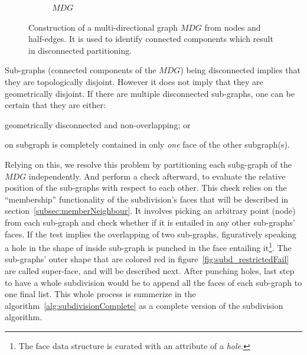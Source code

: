\begin{figure}
\begin{subfigure}{.32\textwidth}
    \caption{$\mathit{MDG}$} \label{subfig:subd_mdg_c}
  \end{subfigure}%
  \caption[xxx]
          {Construction of a multi-directional graph $\mathit{MDG}$ from nodes and half-edges.
          It is used to identify connected components which result in disconnected partitioning.}
  \label{fig:subd_mdg}
\end{figure}

Sub-graphs (connected components of the $\mathit{MDG}$) being disconnected implies that they are topologically disjoint.
However it does not imply that they are geometrically disjoint.
If there are multiple disconnected sub-graphs, one can be certain that they are either:
\begin{inparaenum}
  \item geometrically disconnected and non-overlapping; or
  \item on subgraph is completely contained in only \emph{one} face of the other subgraph(s).
\end{inparaenum}
Relying on this, we resolve this problem by partitioning each subg-graph of the $\mathit{MDG}$ independently.
And perform a check afterward, to evaluate the relative position of the sub-graphs with respect to each other.
This check relies on the ``membership'' functionality of the subdivision's faces that will be described in section~\ref{subsec:memberNeighbour}.
It involves picking an arbitrary point (node) from each sub-graph and check whether if it is entailed in any other sub-graphs' faces.
If the test implies the overlapping of two sub-graphs, figuratively speaking a hole in the shape of inside sub-graph is punched in the face entailing it\footnote{The face data structure is curated with an attribute of a \emph{hole}.}.
The sub-graphs' outer shape that are colored red in figure~\ref{fig:subd_restrictedFail} are called super-face, and will be described next.
After punching holes, last step to have a whole subdivision would be to append all the faces of each sub-graph to one final list.
This whole process is summerize in the algorithm~\ref{alg:subdivisionComplete} as a complete version of the subdivision algorithm.


